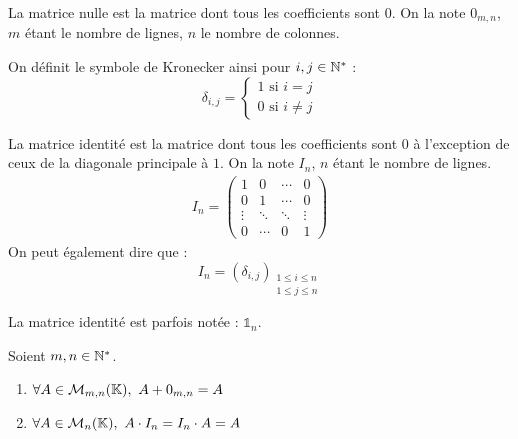 \begin{definition}
	La matrice nulle est la matrice dont tous les coefficients sont $0$. On la note $0_{m,n}$, $m$ étant le nombre de lignes, $n$ le nombre de colonnes. 
\end{definition}

\begin{definition}
	On définit le symbole de Kronecker ainsi pour $i, j \in \mathbb{N}^*$ :
	\[ \delta_{i,j} = 
	\begin{cases}
		1 \text{ si } i = j \\
		0 \text{ si } i \neq j
	\end{cases}
	\]
\end{definition}

\begin{definition}
	La matrice identité est la matrice dont tous les coefficients sont $0$ à l'exception de ceux de la diagonale principale à $1$. On la note $I_n$, $n$ étant le nombre de lignes.
	\begin{align*}
		I_n = 
		\begin{pmatrix}
			1 & 0 & \cdots & 0 \\
			0 & 1 & \cdots & 0 \\
			\vdots & \ddots & \ddots & \vdots \\
			0 & \cdots & 0 & 1
		\end{pmatrix}
	\end{align*}
	On peut également dire que :
	\[ I_n = (\delta_{i,j})_{\substack{1 \leq i \leq n \\ 1 \leq j \leq n}} \]
\end{definition}

\begin{remark}
    La matrice identité est parfois notée : $\mathds{1}_n$.
\end{remark}

\begin{lemma}
	Soient $m,n \in \mathbb{N}^*$.
	\begin{multicols}{2}
	    \begin{enumerate}
    		\item $\forall A \in \mathcal{M}_{m, n}(\K),\ A + 0_{m,n} = A$
    		\item $\forall A \in \mathcal{M}_{n}(\mathbb{K}),\ A \cdot I_n = I_n \cdot A = A$
    	\end{enumerate}
	\end{multicols}
\end{lemma}

